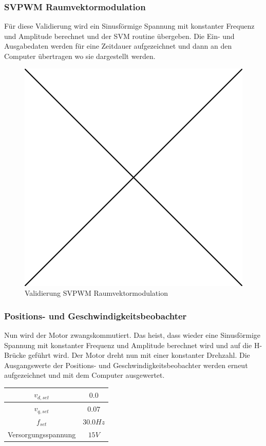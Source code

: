 \subsubsection*{SVPWM Raumvektormodulation}
Für diese Validierung wird ein Sinusförmige Spannung mit konstanter Frequenz und Amplitude berechnet und der SVM routine übergeben. Die Ein- und Ausgabedaten werden für eine Zeitdauer aufgezeichnet und dann an den Computer übertragen wo sie dargestellt werden.

\begin{figure} [H]
	\centering
	\includegraphics[width=0.5\linewidth]{images/placeholder.png}
	\caption{Validierung SVPWM Raumvektormodulation}
	\label{fig:svpwm}
\end{figure}

\subsubsection*{Positions- und Geschwindigkeitsbeobachter} \label{val:obs}
Nun wird der Motor zwangskommutiert. Das heist, dass wieder eine Sinusförmige Spannung mit konstanter Frequenz und Amplitude berechnet wird und auf die H-Brücke geführt wird. Der Motor dreht nun mit einer konstanter Drehzahl. Die Ausgangswerte der Positions- und Geschwindigkeitsbeobachter werden erneut aufgezeichnet und mit dem Computer ausgewertet.

\begin{center}
	\begin{tabular}{|c|c|}
		\hline 
		$v_{d,set}$ & $0.0$ \\ \hline
		$v_{q,set}$ & $0.07$ \\ \hline
		$f_{set}$ & $30.0Hz$ \\ \hline
		Versorgungsspannung & $15V$ \\ \hline
	\end{tabular} 
	\label{tab:obsmessbed}
\end{center}


